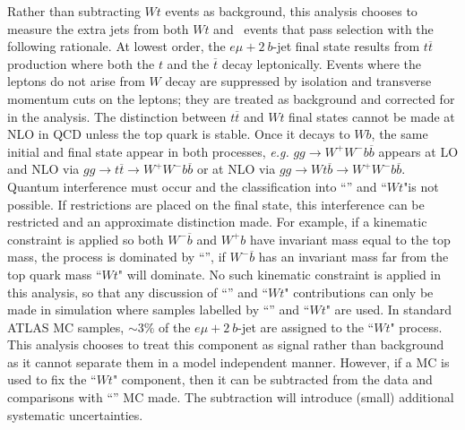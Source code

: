 Rather than subtracting $Wt$ events as background, this analysis chooses to measure the extra jets from both $Wt$ and \ttbar\ events that pass selection with the following rationale. At lowest order, the $e\mu+2\ b$-jet final state results from $t\overline t$ production where both the 
$t$ and the $\overline t$  decay leptonically.  
Events where the leptons do not arise from $W$ decay are suppressed by isolation and
transverse momentum cuts on the leptons; they are treated as background and corrected for in the analysis.
The distinction between $t\overline{t}$ and $Wt$ final states cannot be made at NLO in QCD unless the top quark is stable.
Once it decays to $Wb$, the same initial and final state appear in both processes,
\textit{ e.g.} $gg\to W^+W^- b \overline{b}$ appears at LO and NLO via $gg\to  t\overline{t}\to W^+W^- b \overline{b}$ or
at NLO via  $gg\to  Wt\overline{b} \to W^+W^- b \overline{b}$.
Quantum interference must occur and the classification into
``\ttbar'' and ``$Wt$"is not possible. If restrictions are placed on the final state,
 this interference can be restricted and an approximate distinction made. For example,
if a kinematic constraint is applied so both  $W^-\overline{b}$ and  $W^+ b$
have invariant mass equal to the top mass, 
the process is dominated by ``\ttbar'', if  $W^-\overline{b}$ has an invariant mass
far from the top quark mass ``$Wt$" will dominate.
No such kinematic constraint is applied in this analysis, so that any discussion of  ``\ttbar'' 
and ``$Wt$" contributions can only be made in simulation where samples labelled by 
 ``\ttbar'' and ``$Wt$" are used.  In standard ATLAS MC samples, $\sim 3\%$ of the 
$e\mu+2\ b$-jet are assigned to the ``$Wt$" process.  This analysis chooses to treat this
component as signal rather than background as it cannot separate them in a model independent manner. However, if a MC is used to fix the
 ``$Wt$" component, then it can be subtracted from the data and comparisons with ``\ttbar'' MC made. The subtraction will 
introduce (small) additional systematic uncertainties. 



